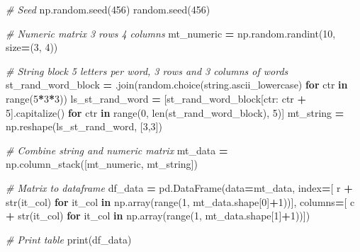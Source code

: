 \documentclass[
]{book}
\newenvironment{Shaded}{\begin{snugshade}}{\end{snugshade}}
\newcommand{\BuiltInTok}[1]{#1}
\newcommand{\CommentTok}[1]{\textcolor[rgb]{0.56,0.35,0.01}{\textit{#1}}}
\newcommand{\ControlFlowTok}[1]{\textcolor[rgb]{0.13,0.29,0.53}{\textbf{#1}}}
\newcommand{\DecValTok}[1]{\textcolor[rgb]{0.00,0.00,0.81}{#1}}
\newcommand{\KeywordTok}[1]{\textcolor[rgb]{0.13,0.29,0.53}{\textbf{#1}}}
\newcommand{\NormalTok}[1]{#1}
\newcommand{\OperatorTok}[1]{\textcolor[rgb]{0.81,0.36,0.00}{\textbf{#1}}}
\newcommand{\StringTok}[1]{\textcolor[rgb]{0.31,0.60,0.02}{#1}}
\begin{document}
\begin{Shaded}
\begin{Highlighting}[]
\CommentTok{\# Seed}
\NormalTok{np.random.seed(}\DecValTok{456}\NormalTok{)}
\NormalTok{random.seed(}\DecValTok{456}\NormalTok{)}

\CommentTok{\# Numeric matrix 3 rows 4 columns}
\NormalTok{mt\_numeric }\OperatorTok{=}\NormalTok{ np.random.randint(}\DecValTok{10}\NormalTok{, size}\OperatorTok{=}\NormalTok{(}\DecValTok{3}\NormalTok{, }\DecValTok{4}\NormalTok{))}

\CommentTok{\# String block 5 letters per word, 3 rows and 3 columns of words}
\NormalTok{st\_rand\_word\_block }\OperatorTok{=} \StringTok{\textquotesingle{}\textquotesingle{}}\NormalTok{.join(random.choice(string.ascii\_lowercase) }\ControlFlowTok{for}\NormalTok{ ctr }\KeywordTok{in} \BuiltInTok{range}\NormalTok{(}\DecValTok{5}\OperatorTok{*}\DecValTok{3}\OperatorTok{*}\DecValTok{3}\NormalTok{))}
\NormalTok{ls\_st\_rand\_word }\OperatorTok{=}\NormalTok{ [st\_rand\_word\_block[ctr: ctr }\OperatorTok{+} \DecValTok{5}\NormalTok{].capitalize() }\ControlFlowTok{for}\NormalTok{ ctr }\KeywordTok{in} \BuiltInTok{range}\NormalTok{(}\DecValTok{0}\NormalTok{, }\BuiltInTok{len}\NormalTok{(st\_rand\_word\_block), }\DecValTok{5}\NormalTok{)]}
\NormalTok{mt\_string }\OperatorTok{=}\NormalTok{ np.reshape(ls\_st\_rand\_word, [}\DecValTok{3}\NormalTok{,}\DecValTok{3}\NormalTok{])}

\CommentTok{\# Combine string and numeric matrix}
\NormalTok{mt\_data }\OperatorTok{=}\NormalTok{ np.column\_stack([mt\_numeric, mt\_string])}

\CommentTok{\# Matrix to dataframe}
\NormalTok{df\_data }\OperatorTok{=}\NormalTok{ pd.DataFrame(data}\OperatorTok{=}\NormalTok{mt\_data,}
\NormalTok{                       index}\OperatorTok{=}\NormalTok{[ }\StringTok{\textquotesingle{}r\textquotesingle{}} \OperatorTok{+} \BuiltInTok{str}\NormalTok{(it\_col) }\ControlFlowTok{for}\NormalTok{ it\_col }\KeywordTok{in}\NormalTok{ np.array(}\BuiltInTok{range}\NormalTok{(}\DecValTok{1}\NormalTok{, mt\_data.shape[}\DecValTok{0}\NormalTok{]}\OperatorTok{+}\DecValTok{1}\NormalTok{))],}
\NormalTok{                       columns}\OperatorTok{=}\NormalTok{[ }\StringTok{\textquotesingle{}c\textquotesingle{}} \OperatorTok{+} \BuiltInTok{str}\NormalTok{(it\_col) }\ControlFlowTok{for}\NormalTok{ it\_col }\KeywordTok{in}\NormalTok{ np.array(}\BuiltInTok{range}\NormalTok{(}\DecValTok{1}\NormalTok{, mt\_data.shape[}\DecValTok{1}\NormalTok{]}\OperatorTok{+}\DecValTok{1}\NormalTok{))])}
            
\CommentTok{\# Print table}
\BuiltInTok{print}\NormalTok{(df\_data)}
\end{Highlighting}
\end{Shaded}
\end{document}
